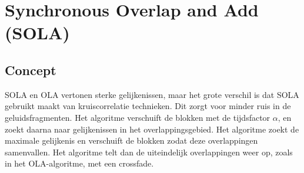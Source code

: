 \documentclass[12pt]{report}
\begin{document}
\section{Synchronous Overlap and Add (SOLA)}
\label{sec:SOLA}

\subsection{Concept}
SOLA en OLA vertonen sterke gelijkenissen, maar het grote verschil is dat SOLA gebruikt maakt van kruiscorrelatie technieken. Dit zorgt voor minder ruis in de geluidsfragmenten.
Het algoritme verschuift de blokken met de tijdsfactor $\alpha$, en zoekt daarna naar gelijkenissen in het overlappingsgebied. Het algoritme zoekt de maximale gelijkenis en verschuift de blokken zodat deze overlappingen samenvallen. Het algoritme telt dan de uiteindelijk overlappingen weer op, zoals in het OLA-algoritme, met een crossfade. 
\end{document}
